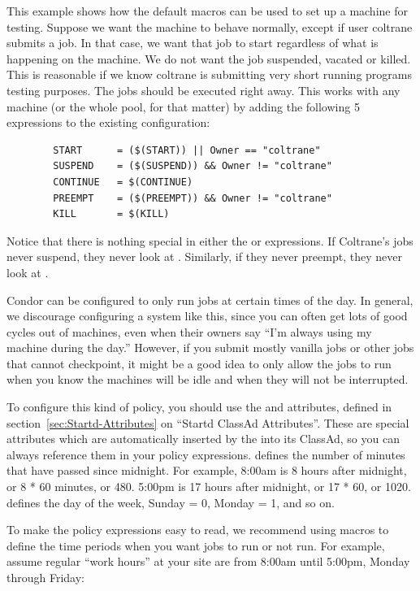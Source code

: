 This example shows how the default macros can be used to
set up a machine for testing.
Suppose we want the machine to
behave normally, except if user coltrane submits a job.
In that case, we
want that job to start regardless of what is happening on the machine.
We do not want the job suspended, vacated or killed.
This is reasonable if 
we know coltrane is submitting very short
running programs testing purposes. 
The jobs should be executed right away.
This works with any machine
(or the whole pool, for that matter) by adding the following 5 expressions
to the existing configuration:
\begin{verbatim}
        START      = ($(START)) || Owner == "coltrane"
        SUSPEND    = ($(SUSPEND)) && Owner != "coltrane"
        CONTINUE   = $(CONTINUE)
        PREEMPT    = ($(PREEMPT)) && Owner != "coltrane"
        KILL       = $(KILL)
\end{verbatim}
Notice that there is nothing special in either the
 or  expressions.
If Coltrane's jobs never suspend, they never look at .  
Similarly, if they never preempt, they never look at . 

Condor can be
configured to only run jobs at
certain times of the day.
In general, we discourage configuring a system like this, since you
can often get lots of good cycles out of machines, even when their
owners say ``I'm always using my machine during the day.''
However, if you submit mostly vanilla jobs or other jobs that cannot
checkpoint, it might be a good idea to only allow the jobs to run when
you know the machines will be idle and when they will not be
interrupted.

To configure this kind of policy, you should use the 
and  attributes, defined in
section~\ref{sec:Startd-Attributes} on ``Startd ClassAd Attributes''.
These are special attributes which are automatically inserted by the
 into its ClassAd, so you can always reference them in
your policy expressions.
 defines the number of minutes that have passed since
midnight.  
For example, 8:00am is 8 hours after midnight, or 8 * 60 minutes, or
480.
5:00pm is 17 hours after midnight, or 17 * 60, or 1020.
 defines the day of the week, Sunday = 0, Monday = 1,
and so on.  

To make the policy expressions easy to read, we recommend using macros
to define the time periods when you want jobs to run or not run.  
For example, assume regular ``work hours'' at your site are from
8:00am until 5:00pm, Monday through Friday: 


